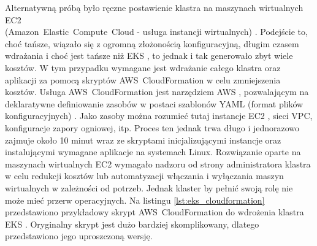 Alternatywną próbą było ręczne postawienie klastra na maszynach wirtualnych EC2 \\ (\mbox{Amazon Elastic Compute Cloud} - usługa instancji wirtualnych) \cite{ec2_docs}. Podejście to, choć tańsze, wiązało się z ogromną złożonością konfiguracyjną, długim czasem wdrażania i choć jest tańsze niż EKS \cite{eks_docs}, to jednak i tak generowało zbyt wiele kosztów. W tym przypadku wymagane jest wdrażanie całego klastra oraz aplikacji za pomocą skryptów \mbox{AWS CloudFormation} \cite{cloudformation_docs} w celu zmniejszenia kosztów. Usługa \mbox{AWS CloudFormation} \cite{cloudformation_docs} jest narzędziem AWS \cite{aws_docs}, pozwalającym na deklaratywne definiowanie zasobów w postaci szablonów YAML (format plików konfiguracyjnych) \cite{yaml_spec}. Jako zasoby można rozumieć tutaj instancje EC2 \cite{ec2_docs}, sieci VPC, konfiguracje zapory ogniowej, itp. Proces ten jednak trwa długo i jednorazowo zajmuje około 10 minut wraz ze skryptami inicjalizującymi instancje oraz instalującymi wymagane aplikacje na systemach Linux. Rozwiązanie oparte na maszynach wirtualnych EC2 \cite{ec2_docs} wymagało nadzoru od strony administratora klastra w celu redukcji kosztów lub automatyzacji włączania i wyłączania maszyn wirtualnych w zależności od potrzeb. Jednak klaster by pełnić swoją rolę nie może mieć przerw operacyjnych. Na listingu \ref{lst:eks_cloudformation} przedstawiono przykładowy skrypt \mbox{AWS CloudFormation} \cite{cloudformation_docs} do wdrożenia klastra EKS \cite{eks_docs}. Oryginalny skrypt jest dużo bardziej skomplikowany, dlatego przedstawiono jego uproszczoną wersję.

